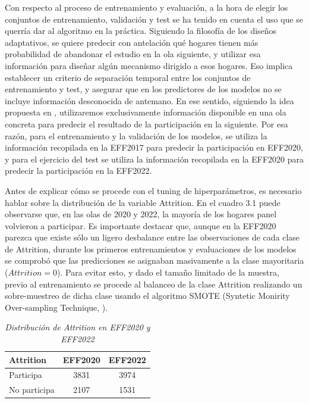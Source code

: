 Con respecto al proceso de entrenamiento y evaluación, a la hora de elegir los conjuntos de entrenamiento, validación y test se ha tenido en cuenta el uso que se querría dar al algoritmo en la práctica. Siguiendo la filosofía de los diseños adaptativos, se quiere predecir con antelación qué hogares tienen más probabilidad de abandonar el estudio en la ola siguiente, y utilizar esa información para diseñar algún mecanismo dirigido a esos hogares. Eso implica establecer un criterio de separación temporal entre los conjuntos de entrenamiento y test, y asegurar que en los predictores de los modelos no se incluye información desconocida de antemano. En ese sentido, siguiendo la idea propuesta en \cite{beste2023case}, utilizaremos exclusivamente información disponible en una ola concreta para predecir el resultado de la participación en la siguiente. Por esa razón, para el entrenamiento y la validación de los modelos, se utiliza la información recopilada en la EFF2017 para predecir la participación en EFF2020, y para el ejercicio del test se utiliza la información recopilada en la EFF2020 para predecir la participación en la EFF2022.

Antes de explicar cómo se procede con el tuning de hiperparámetros, es necesario hablar sobre la distribución de la variable Attrition. En el cuadro 3.1 puede observarse que, en las olas de 2020 y 2022, la mayoría de los hogares panel volvieron a participar. Es importante destacar que, aunque en la EFF2020 parezca que existe sólo un ligero desbalance entre las observaciones de cada clase de Attrition, durante los primeros entrenamientos y evaluaciones de los modelos se comprobó que las predicciones se asignaban masivamente a la clase mayoritaria ($Attrition=0$). Para evitar esto, y dado el tamaño limitado de la muestra, previo al entrenamiento se procede al balanceo de la clase Attrition realizando un sobre-muestreo de dicha clase usando el algoritmo SMOTE (Syntetic Monirity Over-sampling Technique, \cite{chawla2002smote}).

\begin{table}[h]
    \centering{}
    \begin{tabular}{ | l | c | c |}
    \hline
    Attrition & EFF2020 & EFF2022 \\ \hline
    Participa & 3831 & 3974 \\ \hline
    No participa  & 2107 & 1531 \\
    \hline
    \end{tabular}
    \caption{\textit{Distribución de Attrition en EFF2020 y EFF2022}}
\end{table}

